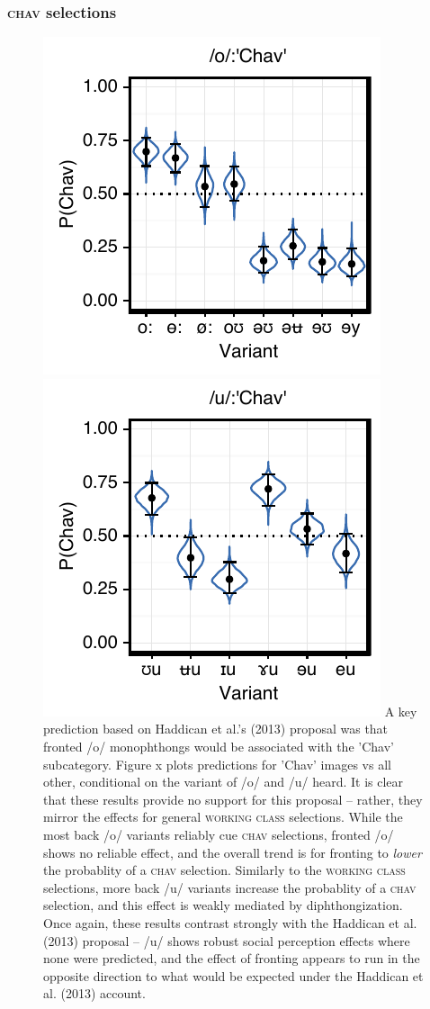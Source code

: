 \documentclass[PWPL]{article}
\begin{document}
\subsubsection{\textsc{chav} selections}
\begin{figure}[H]
\centering
\includegraphics[scale=0.8]{ow_chav.pdf}
\includegraphics[scale=0.8]{uw_chav.pdf}
A key prediction based on Haddican et al.'s (2013) proposal was that fronted /o/ monophthongs would be associated with the 'Chav' subcategory. Figure x plots predictions for 'Chav' images vs all other, conditional on the variant of /o/ and /u/ heard. It is clear that these results provide no support for this proposal -- rather, they mirror the effects for general  \textsc{working class} selections. While the most back /o/ variants reliably cue \textsc{chav} selections, fronted /o/ shows no reliable effect, and the overall trend is for fronting to \textit{lower} the probablity of a \textsc{chav} selection. Similarly to the \textsc{working class} selections, more back /u/ variants increase the probablity of a \textsc{chav} selection, and this effect is weakly mediated by diphthongization. Once again, these results contrast strongly with the Haddican et al. (2013) proposal -- /u/ shows robust social perception effects where none were predicted, and the effect of fronting appears to run in the opposite direction to what would be expected under the Haddican et al. (2013) account.
\end{figure}
\end{document}
